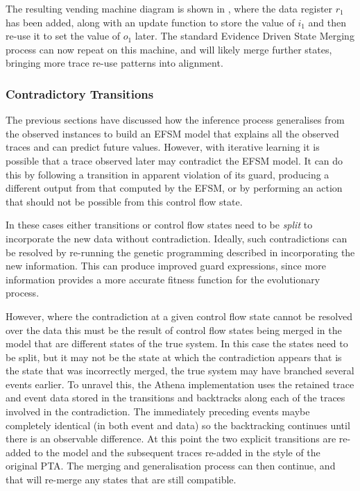 The resulting vending machine diagram is shown in , where the data register $r_1$ has been added, along with an update function to store the value of $i_1$ and then re-use it to set the value of $o_1$ later. The standard Evidence Driven State Merging process can now repeat on this machine, and will likely merge further states, bringing more trace re-use patterns into alignment.

\subsubsection{Contradictory Transitions}
\label{Splitting}

The previous sections have discussed how the inference process generalises from the observed instances to build an EFSM model that explains all the observed traces and can predict future values. However, with iterative learning it is possible that a trace observed later may contradict the EFSM model. It can do this by following a transition in apparent violation of its guard, producing a different output from that computed by the EFSM, or by performing an action that should not be possible from this control flow state.

In these cases either transitions or control flow states need to be \emph{split} to incorporate the new data without contradiction. Ideally, such contradictions can be resolved by re-running the genetic programming described in  incorporating the new information. This can produce improved guard expressions, since more information provides a more accurate fitness function for the evolutionary process. 

However, where the contradiction at a given control flow state cannot be resolved over the data this must be the result of control flow states being merged in the model that are different states of the true system. In this case the states need to be split, but it may not be the state at which the contradiction appears that is the state that was incorrectly merged, the true system may have branched several events earlier. To unravel this, the Athena implementation uses the retained trace and event data stored in the transitions and backtracks along each of the traces involved in the contradiction. The immediately preceding events maybe completely identical (in both event and data) so the backtracking continues until there is an observable difference. At this point the two explicit transitions are re-added to the model and the subsequent traces re-added in the style of the original PTA. The merging and generalisation process can then continue, and that will re-merge any states that are still compatible.


